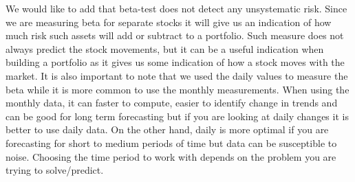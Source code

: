 \noindent
We would like to add that beta-test does not detect any unsystematic risk. Since we are measuring beta for separate stocks it will give us an indication of how much risk such assets will add or subtract to a portfolio. Such measure does not always predict the stock movements, but it can be a useful indication when building a portfolio as it gives us some indication of how a stock moves with the market. It is also important to note that we used the daily values to measure the beta while it is more common to use the monthly measurements. When using the monthly data, it can faster to compute, easier to identify change in trends and can be good for long term forecasting but if you are looking at daily changes it is better to use daily data. On the other hand, daily is more optimal if you are forecasting for short to medium periods of time but data can be susceptible to noise. Choosing the time period to work with depends on the problem you are trying to solve/predict. 

